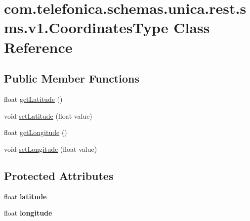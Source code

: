 \hypertarget{classcom_1_1telefonica_1_1schemas_1_1unica_1_1rest_1_1sms_1_1v1_1_1CoordinatesType}{
\section{com.telefonica.schemas.unica.rest.sms.v1.CoordinatesType Class Reference}
\label{classcom_1_1telefonica_1_1schemas_1_1unica_1_1rest_1_1sms_1_1v1_1_1CoordinatesType}
}
\subsection*{Public Member Functions}
\begin{DoxyCompactItemize}
\item 
float \hyperlink{classcom_1_1telefonica_1_1schemas_1_1unica_1_1rest_1_1sms_1_1v1_1_1CoordinatesType_a4a1d7925edf81ff0ab748860c13ffe88}{getLatitude} ()
\item 
void \hyperlink{classcom_1_1telefonica_1_1schemas_1_1unica_1_1rest_1_1sms_1_1v1_1_1CoordinatesType_ae8ef09c779a4e7e84b95bbf20b13dbdf}{setLatitude} (float value)
\item 
float \hyperlink{classcom_1_1telefonica_1_1schemas_1_1unica_1_1rest_1_1sms_1_1v1_1_1CoordinatesType_afe8f08b06c291f588fd795b2fb6c47a5}{getLongitude} ()
\item 
void \hyperlink{classcom_1_1telefonica_1_1schemas_1_1unica_1_1rest_1_1sms_1_1v1_1_1CoordinatesType_a500cbb7618bcfeba65d5e9478888a57d}{setLongitude} (float value)
\end{DoxyCompactItemize}
\subsection*{Protected Attributes}
\begin{DoxyCompactItemize}
\item 
\hypertarget{classcom_1_1telefonica_1_1schemas_1_1unica_1_1rest_1_1sms_1_1v1_1_1CoordinatesType_a4e353b8eeee008b6150faa00542a9809}{
float {\bfseries latitude}}
\label{classcom_1_1telefonica_1_1schemas_1_1unica_1_1rest_1_1sms_1_1v1_1_1CoordinatesType_a4e353b8eeee008b6150faa00542a9809}

\item 
\hypertarget{classcom_1_1telefonica_1_1schemas_1_1unica_1_1rest_1_1sms_1_1v1_1_1CoordinatesType_af61a7c71e24015d348fa79449a814e30}{
float {\bfseries longitude}}
\label{classcom_1_1telefonica_1_1schemas_1_1unica_1_1rest_1_1sms_1_1v1_1_1CoordinatesType_af61a7c71e24015d348fa79449a814e30}

\end{DoxyCompactItemize}


